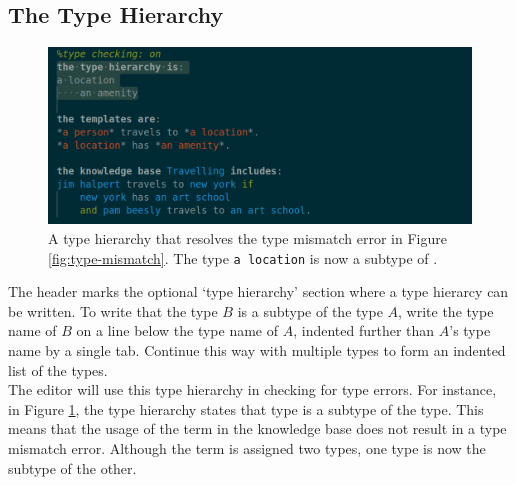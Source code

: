 \documentclass[../main.tex]{subfiles}
\begin{document}
\subsection{The Type Hierarchy}
\label{section:type-hierarcy-features}
\begin{figure}[h!]
\centering
\includegraphics[width = \linewidth]{./figures/type-hierarchy.png}
\caption{A type hierarchy that resolves the type mismatch error in Figure \ref{fig:type-mismatch}. The type \lstinline{a location} is now a subtype of .}
\label{fig:type-hierarchy}
\end{figure}
The header  marks the optional `type hierarchy' section where a type hierarcy can be written. To write that the type $B$ is a subtype of the type $A$, write the type name of $B$ on a line below the type name of $A$, indented further than $A$'s type name by a single tab. Continue this way with multiple types to form an indented list of the types.
\\
The editor will use this type hierarchy in checking for type errors. For instance, in Figure \ref{fig:type-hierarchy}, the type hierarchy states that type  is a subtype of the type. This means that the usage of the term  in the knowledge base does not result in a type mismatch error. Although the term is assigned two types, one type is now the subtype of the other.
\end{document}
